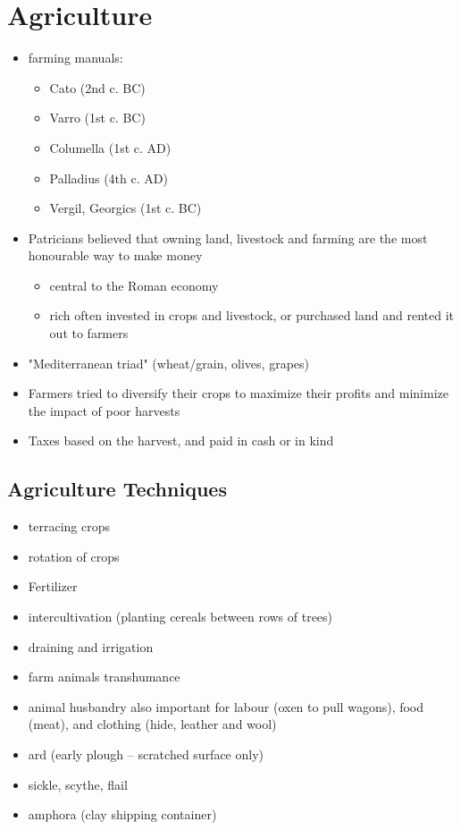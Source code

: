 \documentclass[12pt, twoside]{article}
\begin{document}
\section{Agriculture}
\begin{itemize}
\item farming manuals: 
	\begin{itemize}
	\item Cato (2nd c. BC)
	\item Varro (1st c. BC)
	\item Columella (1st c. AD)
	\item Palladius (4th c. AD)
	\item Vergil, Georgics (1st c. BC)
	\end{itemize}
\item Patricians believed that owning land, livestock and farming are the most honourable way to make money
	\begin{itemize}
	\item central to the Roman economy
	\item rich often invested in crops and livestock, or purchased land and rented it out to farmers
	\end{itemize}
\item "Mediterranean triad" (wheat/grain, olives, grapes)
\item Farmers tried to diversify their crops to maximize their profits and minimize the impact of poor harvests
\item Taxes based on the harvest, and paid in cash or in kind
\end{itemize}

\subsection{Agriculture Techniques}
\begin{itemize}
\item terracing crops
\item rotation of crops
\item Fertilizer
\item intercultivation (planting cereals between rows of trees)
\item draining and irrigation
\item farm animals transhumance
\item animal husbandry also important for labour (oxen to pull wagons), food (meat), and clothing (hide, leather and wool)
\item ard (early plough -- scratched surface only)
\item sickle, scythe, flail
\item amphora (clay shipping container)
\end{itemize}
\end{document}
